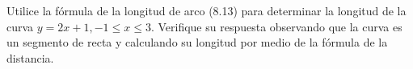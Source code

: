 \item Utilice la fórmula de la longitud de arco (8.13) para determinar la longitud de la curva $y = 2x + 1, -1 \le x \le 3$. Verifique su respuesta observando que la curva es un segmento de recta y calculando su longitud por medio de la fórmula de la distancia.
